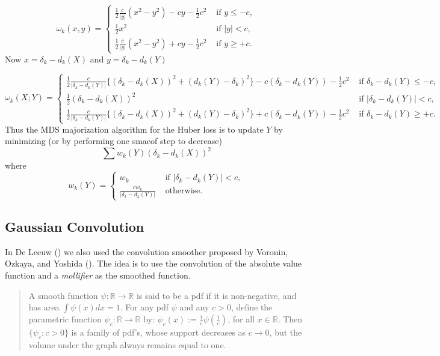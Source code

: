 \documentclass[
  12pt,
  letterpaper,
  DIV=11,
  numbers=noendperiod]{scrartcl}
\begin{document}
\[
\omega_k(x,y)=\begin{cases}
\frac12\frac{c}{|y|}(x^2-y^2)-cy-\frac12c^2&\text{ if }y\leq -c,\\
\frac12x^2&\text{ if }|y|<c,\\
\frac12\frac{c}{|y|}(x^2-y^2)+cy-\frac12c^2&\text{ if }y\geq +c.
\end{cases}
\] Now \(x=\delta_k-d_k(X)\) and \(y=\delta_k-d_k(Y)\)

\[
\omega_k(X;Y)=\begin{cases}
\frac12\frac{c}{|\delta_k-d_k(Y)|}\{(\delta_k-d_k(X))^2+(d_k(Y)-\delta_k)^2\}-c(\delta_k-d_k(Y))-\frac12c^2&\text{ if }\delta_k-d_k(Y)\leq -c,\\
\frac12(\delta_k-d_k(X))^2&\text{ if }|\delta_k-d_k(Y)|<c,\\
\frac12\frac{c}{|\delta_k-d_k(Y)|}\{(\delta_k-d_k(X))^2+(d_k(Y)-\delta_k)^2\}+c(\delta_k-d_k(Y))-\frac12c^2&\text{ if }\delta_k-d_k(Y)\geq +c.
\end{cases}
\] Thus the MDS majorization algorithm for the Huber loss is to update
\(Y\) by minimizing (or by performing one smacof step to decrease) \[
\sum w_k(Y)(\delta_k-d_k(X))^2
\] where \[
w_k(Y)=\begin{cases}
w_k&\text{ if }|\delta_k-d_k(Y)|<c,\\
\frac{cw_k}{|\delta_k-d_k(Y)|}&\text{ otherwise}.
\end{cases}
\]

\subsection{Gaussian Convolution}\label{gaussian-convolution}

In De Leeuw () we also used the
convolution smoother proposed by Voronin, Ozkaya, and Yoshida
(). The idea is to use the
convolution of the absolute value function and a \emph{mollifier} as the
smoothed function.

\begin{quote}
A smooth function \(\psi:\mathbb{R}\rightarrow\mathbb{R}\) is said to be
a pdf if it is non-negative, and has area \(\int\psi(x)dx=1\). For any
pdf \(\psi\) and any \(c>0\), deﬁne the parametric function
\(\psi_c:\mathbb{R}\rightarrow\mathbb{R}\) by:
\(\psi_c(x):= \frac{1}{c}\psi (\frac{1}{c})\), for all
\(x\in\mathbb{R}\). Then \(\{\psi_c:c>0\}\) is a family of pdf's, whose
support decreases as \(c\rightarrow 0\), but the volume under the graph
always remains equal to one.
\end{quote}
\end{document}
